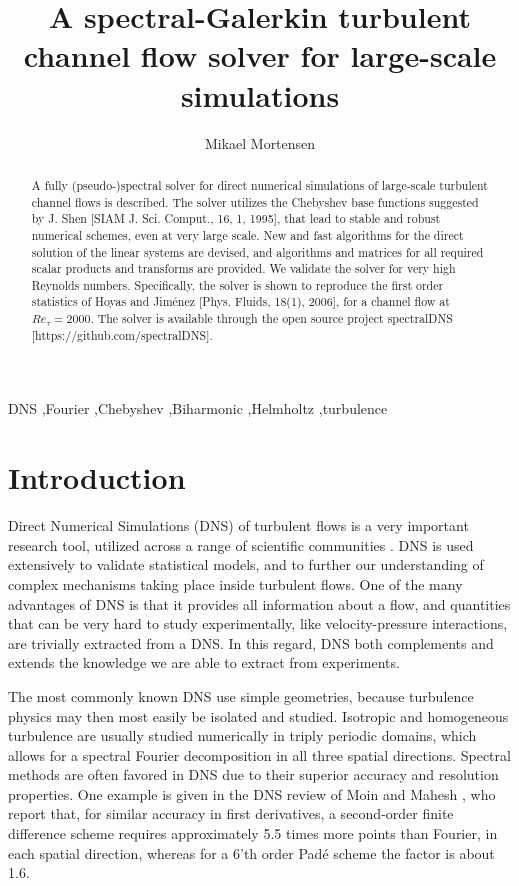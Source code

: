 \documentclass[preprint]{elsarticle}
\begin{document}
\begin{frontmatter}

\title{A spectral-Galerkin turbulent channel flow solver for large-scale simulations}
\author[mmo]{Mikael Mortensen}
\address[mmo]{Department of Mathematics, Division of Mechanics, University of Oslo}

\begin{abstract}
A fully (pseudo-)spectral solver for direct numerical simulations of large-scale turbulent channel flows is described. The solver utilizes the Chebyshev base functions suggested by J. Shen [SIAM J. Sci. Comput., 16, 1, 1995], that lead to stable and robust numerical schemes, even at very large scale. New and fast algorithms for the direct solution of the linear systems are devised, and algorithms and matrices for all required scalar products and transforms are provided. We validate the solver for very high Reynolds numbers. Specifically, the solver is shown to reproduce the first order statistics of Hoyas and Jim\'{e}nez [Phys. Fluids, 18(1), 2006], for a channel flow at $Re_{\tau}=2000$. The solver is available through the open source project spectralDNS [https://github.com/spectralDNS].
\end{abstract}
\begin{keyword}
DNS \sep Fourier \sep Chebyshev \sep Biharmonic \sep Helmholtz \sep turbulence
\end{keyword}

\end{frontmatter}
\section{Introduction}
Direct Numerical Simulations (DNS) of turbulent flows is a very important research tool, utilized across a range of scientific communities \cite{Moin98}. DNS is used extensively to validate statistical models, and to further our understanding of complex mechanisms taking place inside turbulent flows. One of the many advantages of DNS is that it provides all information about a flow, and quantities that can be very hard to study experimentally, like velocity-pressure interactions, are trivially extracted from a DNS. In this regard, DNS both complements and extends the knowledge we are able to extract from experiments.

The most commonly known DNS use simple geometries, because turbulence physics may then most easily be isolated and studied. Isotropic and homogeneous turbulence are usually studied numerically in triply periodic domains, which allows for a spectral Fourier decomposition in all three spatial directions. Spectral methods are often favored in DNS due to their superior accuracy and resolution properties. One example is given in the DNS review of Moin and Mahesh \cite{Moin98}, who report that, for similar accuracy in first derivatives, a second-order finite difference scheme requires approximately 5.5 times more points than Fourier, in each spatial direction, whereas for a 6'th order Pad\'{e} scheme the factor is about 1.6.
\end{document}
